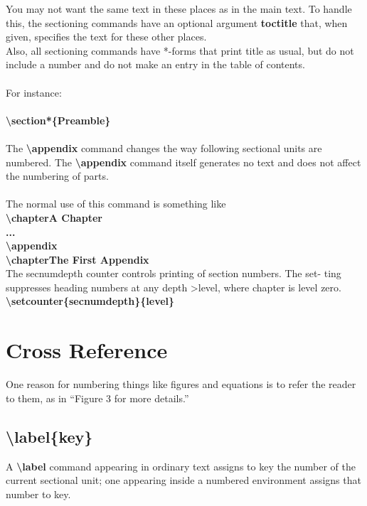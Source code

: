 \documentclass[12pt]{article}
\begin{document}
{You may not want the same text in these places as in the main text. To
handle this, the sectioning commands have an optional argument \textbf{toctitle}
that, when given, specifies the text for these other places.\\

Also, all sectioning commands have *-forms that print title as usual, but
do not include a number and do not make an entry in the table of contents.\\\\
For instance:\\\\
\indent \textbf {\textbackslash section*\{Preamble\}}\\\\
\indent The\textbf{ \textbackslash appendix }command changes the way following sectional units are
numbered. The\textbf{ \textbackslash appendix }command itself generates no text and does not
affect the numbering of parts.\\\\
The normal use of this command is something like\\


\indent \textbf{\textbackslash chapter{A Chapter}\\
\indent ...\\
\indent \textbackslash appendix\\
\indent \textbackslash chapter{The First Appendix}}\\ 


\indent The secnumdepth counter controls printing of section numbers. The set-
ting suppresses heading numbers at any depth \textgreater  level, where chapter is level
zero.\\


\indent \textbf {\textbackslash setcounter\{secnumdepth\}\{level\} }\\


\section{Cross Reference}
One reason for numbering things like figures and equations is to refer the
reader to them, as in \textquotedblleft Figure 3 for more details.\textquotedblright

\subsection{\textbackslash label\{key\} }
A   \textbf{\textbackslash label} command appearing in ordinary text assigns to key the number
of the current sectional unit; one appearing inside a numbered environment
assigns that number to key.\\


}
\end{document}
